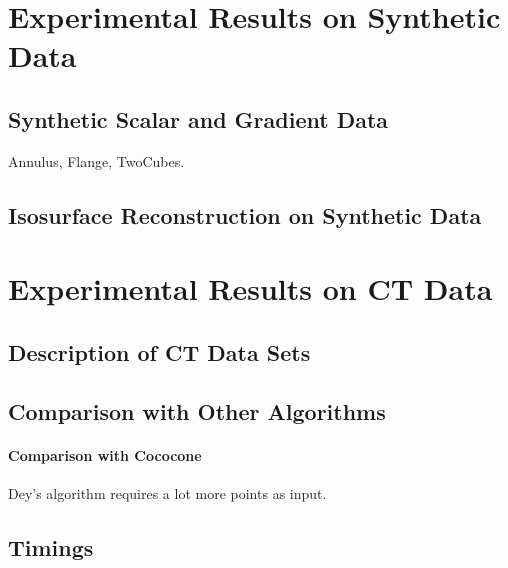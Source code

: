 
\section{Experimental Results on Synthetic Data}

\subsection{Synthetic Scalar and Gradient Data}

Annulus, Flange, TwoCubes.

\subsection{Isosurface Reconstruction on Synthetic Data}

\section{Experimental Results on CT Data}

\subsection{Description of CT Data Sets}

\subsection{Comparison with Other Algorithms}
\paragraph{Comparison with Cococone}
Dey's algorithm requires a lot more points as input.
\subsection{Timings}


